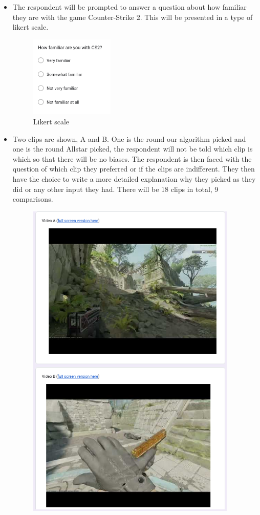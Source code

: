 \begin{itemize}
    \item The respondent will be prompted to answer a question about how familiar they are with the game Counter-Strike 2. This will be presented in a type of likert scale. 
    \begin{figure}[H]
        \centering
        \includegraphics[width=4cm]{Images/likertscale.png}
        \caption{Likert scale}
        \label{fig:likerScale}
    \end{figure}
    \item Two clips are shown, A and B. One is the round our algorithm picked and one is the round Allstar picked, the respondent will not be told which clip is which so that there will be no biases. The respondent is then faced with the question of which clip they preferred or if the clips are indifferent. They then have the choice to write a more detailed explanation why they picked as they did or any other input they had. There will be 18 clips in total, 9 comparisons.
    \begin{figure}[H]
        \centering
        \includegraphics[width=10cm]{Images/A-B_choices.png}

\end{figure}
\end{itemize}
